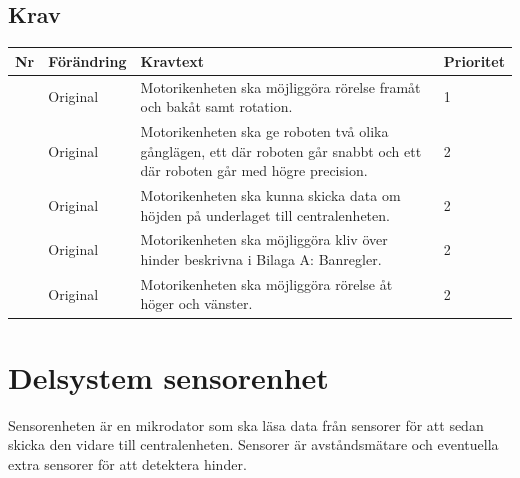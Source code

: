 \documentclass[a4paper,titlepage,12pt]{article}
\newcounter{reqNr}
\newcommand{\nextReqNr}{\stepcounter{reqNr}\arabic{reqNr}}
\begin{document}
	\subsection{Krav}
	\begin{table}[h]
		\label{tab:label}
		\begin{tabularx}{\textwidth}{|c|l|X|l|}
			\hline
			\textbf{Nr} & \textbf{Förändring} & \textbf{Kravtext} & \textbf{Prioritet} 
				\\ \hline

			\nextReqNr & Original & Motorikenheten ska möjliggöra rörelse framåt och 
				bakåt samt rotation. & 1
				\\ \hline

			\nextReqNr & Original & Motorikenheten ska ge roboten två olika gånglägen,
				ett där roboten går 
				snabbt och ett där roboten går med högre precision.& 2
				\\ \hline

			\nextReqNr & Original & Motorikenheten ska kunna skicka data om höjden 
				på underlaget till centralenheten. & 2
				\\ \hline

			\nextReqNr & Original & Motorikenheten ska möjliggöra kliv över hinder 
				beskrivna i Bilaga A:
  				Banregler. & 2
				\\ \hline

			\nextReqNr & Original & Motorikenheten ska möjliggöra rörelse åt höger 
				och vänster. & 2 
				\\\hline

		\end{tabularx}
	\end{table}


	\section{Delsystem sensorenhet}
	Sensorenheten är en mikrodator som ska läsa data från sensorer för att sedan skicka 
	den vidare till centralenheten. Sensorer är avståndsmätare och eventuella extra sensorer 
	för att detektera hinder.
\end{document}
